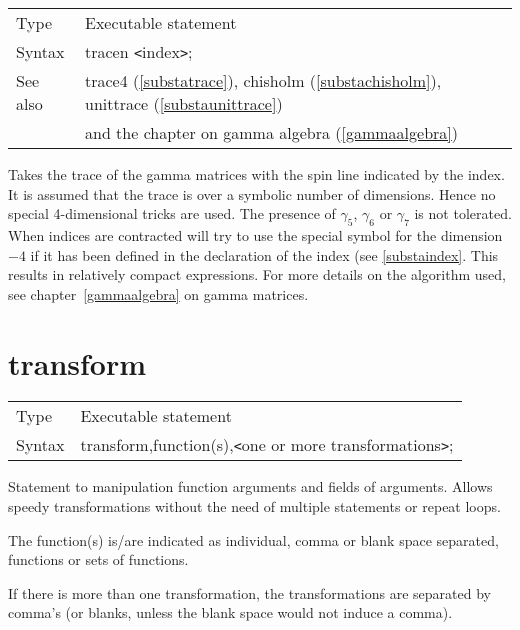\noindent \begin{tabular}{ll}
Type & Executable statement\\
Syntax & tracen {\tt<}index{\tt>}; \\
See also & trace4 (\ref{substatrace}), chisholm (\ref{substachisholm}),
    unittrace (\ref{substaunittrace}) \\ &
    and the chapter on gamma algebra (\ref{gammaalgebra})
\end{tabular} \vspace{4mm}

\noindent Takes the trace of the gamma 
matrices with the spin line indicated by the index. It is 
assumed that the trace is over a symbolic number of dimensions. Hence no 
special 4-dimensional tricks are used. The presence of $\gamma_5$, 
$\gamma_6$ or $\gamma_7$ is not tolerated. When indices are contracted 
{\FORM} will try to use the special symbol for the dimension$-4$ if it has 
been defined in the declaration of the index (see \ref{substaindex}. This 
results in relatively compact expressions. For more details on the 
algorithm used, see chapter~\ref{gammaalgebra} on gamma matrices. 
\vspace{10mm}

 
\section{transform}
\label{substatransform}

\noindent \begin{tabular}{ll}
Type & Executable statement\\
Syntax & transform,function(s),{\tt<}one or more transformations{\tt>};
\end{tabular} \vspace{4mm}

\noindent Statement to manipulation function arguments and 
fields of arguments. Allows speedy transformations without the need of 
multiple statements or repeat loops.

The function(s) is/are indicated as individual, comma or blank space 
separated, functions or sets of functions.

If there is more than one transformation, the transformations are separated 
by comma's (or blanks, unless the blank space would not induce a comma).

